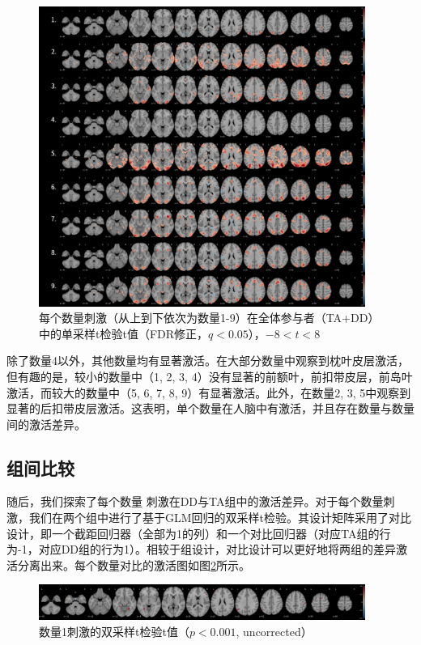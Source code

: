 \documentclass[bachelor, comfort]{shtthesis}
\begin{document}
\begin{figure}[hp]
	\centering
	\includegraphics[width=0.95\textwidth]{figures/1_nums_activation_map.png}
	\caption{\label{fig:nums_activation} 每个数量刺激（从上到下依次为数量1-9）在全体参与者（TA+DD）中的单采样t检验t值（FDR修正，$q<0.05$），$-8<t<8$}
\end{figure}

除了数量4以外，其他数量均有显著激活。在大部分数量中观察到枕叶皮层激活，但有趣的是，较小的数量中（1, 2, 3, 4）没有显著的前额叶，前扣带皮层，前岛叶激活，而较大的数量中（5, 6, 7, 8, 9）有显著激活。此外，在数量2, 3, 5中观察到显著的后扣带皮层激活。这表明，单个数量在人脑中有激活，并且存在数量与数量间的激活差异。

\subsection{组间比较}
随后，我们探索了每个数量 刺激在DD与TA组中的激活差异。对于每个数量刺激，我们在两个组中进行了基于GLM回归的双采样t检验。其设计矩阵采用了对比设计，即一个截距回归器（全部为1的列）和一个对比回归器（对应TA组的行为-1，对应DD组的行为1）。相较于组设计，对比设计可以更好地将两组的差异激活分离出来。每个数量对比的激活图如图\ref{fig:number_contrast}所示。

\begin{figure}[hp]
	\centering
	\includegraphics[width=0.95\textwidth]{figures/2_number_contrast.png}
	\caption{\label{fig:number_contrast} 数量1刺激的双采样t检验t值（$p<0.001$, uncorrected）}
\end{figure}
\end{document}
